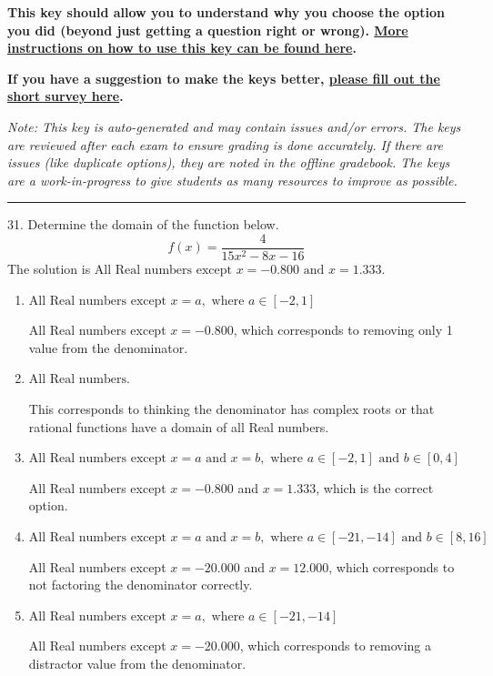 \documentclass{extbook}[14pt]
\begin{document}
\textbf{This key should allow you to understand why you choose the option you did (beyond just getting a question right or wrong). \href{https://xronos.clas.ufl.edu/mac1105spring2020/courseDescriptionAndMisc/Exams/LearningFromResults}{More instructions on how to use this key can be found here}.}

\textbf{If you have a suggestion to make the keys better, \href{https://forms.gle/CZkbZmPbC9XALEE88}{please fill out the short survey here}.}

\textit{Note: This key is auto-generated and may contain issues and/or errors. The keys are reviewed after each exam to ensure grading is done accurately. If there are issues (like duplicate options), they are noted in the offline gradebook. The keys are a work-in-progress to give students as many resources to improve as possible.}

\rule{\textwidth}{0.4pt}

31. Determine the domain of the function below.
\[ f(x) = \frac{4}{15x^{2} -8 x -16} \] 
The solution is $ \text{All Real numbers except } x = -0.800 \text{ and } x = 1.333. $ 

\begin{enumerate}[label=\Alph*.] 
\item $ \text{All Real numbers except } x = a, \text{ where } a \in [-2, 1] $ 

 All Real numbers except $x = -0.800$, which corresponds to removing only 1 value from the denominator. 
\item $ \text{All Real numbers.} $ 

 This corresponds to thinking the denominator has complex roots or that rational functions have a domain of all Real numbers. 
\item $ \text{All Real numbers except } x = a \text{ and } x = b, \text{ where } a \in [-2, 1] \text{ and } b \in [0, 4] $ 

 All Real numbers except $x = -0.800$ and $x = 1.333$, which is the correct option. 
\item $ \text{All Real numbers except } x = a \text{ and } x = b, \text{ where } a \in [-21, -14] \text{ and } b \in [8, 16] $ 

 All Real numbers except $x = -20.000$ and $x = 12.000$, which corresponds to not factoring the denominator correctly. 
\item $ \text{All Real numbers except } x = a, \text{ where } a \in [-21, -14] $ 

 All Real numbers except $x = -20.000$, which corresponds to removing a distractor value from the denominator. 
\end{enumerate} 
 
\end{document}
